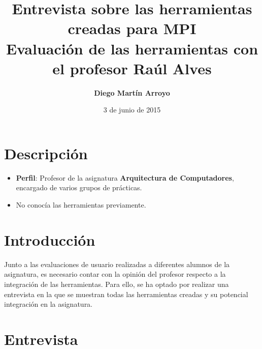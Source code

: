 

\newcommand{\hmwkTitle}{Entrevista sobre las herramientas creadas para MPI} %
\newcommand{\hmwkDueDate}{Miércoles,\ 3\ de\ junio\ de\ 2015}
\newcommand{\hmwkClassInstructor}{Rodrigo Santamaría} %
\newcommand{\hmwkAuthorName}{Diego Martín Arroyo} %
\newcommand{\hmwkSubject}{3, 4} %

\newcommand{\ordinalindicator}{\hspace{-1.5mm}$\phantom{a}^{\circ}$}
\title{\hmwkTitle\\Evaluación de las herramientas con el profesor Raúl Alves}
\author{\textbf{\hmwkAuthorName}}
\date{3 de junio de 2015} %


\maketitle

\tableofcontents
\section{Descripción}

\begin{itemize}
	\item \textbf{Perfil}: Profesor de la asignatura \textbf{Arquitectura de Computadores}, encargado de varios grupos de prácticas.
	\item No conocía las herramientas previamente.
\end{itemize}


\section{Introducción}

Junto a las evaluaciones de usuario realizadas a diferentes alumnos de la asignatura, es necesario contar con la opinión del profesor respecto a la integración de las herramientas. Para ello, se ha optado por realizar una entrevista en la que se muestran todas las herramientas creadas y su potencial integración en la asignatura.

\section{Entrevista}


